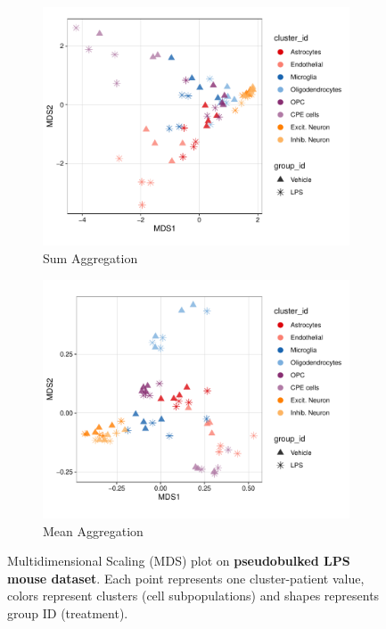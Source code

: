 \documentclass[a4paper, 11pt, twocolumn]{article}
\begin{document}
\begin{figure}[ht]
	\centering
	\begin{subfigure}[t]{0.45\textwidth}
		\centering
		\includegraphics[width=\textwidth]{figs/MDS_LPS_Sum.pdf}
		\caption{Sum Aggregation}
		\label{fig:MDS_Sum}
	\end{subfigure}
	\hfill
	\begin{subfigure}[t]{0.45\textwidth}
		\centering
		\includegraphics[width=\textwidth]{figs/MDS_LPS_Mean.pdf}
		\caption{Mean Aggregation}
		\label{fig:MDS_Mean}
	\end{subfigure}
	\caption{{\small Multidimensional Scaling (MDS) plot on \textbf{pseudobulked LPS mouse dataset}. Each point represents one cluster-patient value, colors represent clusters (cell subpopulations) and shapes represents group ID (treatment).}}
	\label{fig:MDS_plot}
\end{figure}
\end{document}
